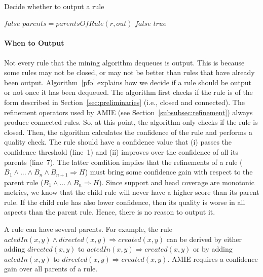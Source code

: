 \ \\[-1cm]
\begin{algorithm}
\caption{Decide whether to output a rule}
\label{pfo}
\begin{algorithmic}[1]
      \State \Return $false$
    \EndIf 
    \State $parents = parentsOfRule(r, out)$
	\State \Return $false$
      \EndIf
    \EndFor
    \State \Return $true$
\EndFunction
\end{algorithmic}
\end{algorithm}

\paragraph{When to Output}\label{subsubsec:whenToOutput}
Not every rule that the mining algorithm dequeues is output. This is because some rules may not be closed, or may not be better than rules that have already been output. Algorithm~\ref{pfo} explains how we decide if a rule should be output or not once it has been dequeued.
The algorithm first checks if the rule is of the form described in Section~\ref{sec:preliminaries} (i.e., closed and connected).
The refinement operators used by AMIE (see Section~\ref{subsubsec:refinement}) always produce connected rules. 
So, at this point, the algorithm only checks if the rule is closed. Then, the algorithm calculates
the confidence of the rule and performs a quality check. The rule should have a confidence value that (i) passes the confidence threshold (line~1)
and (ii) improves over the confidence of all its parents (line~7).
The latter condition implies that the refinements of a rule ($B_1 \wedge ... \wedge B_n \wedge B_{n+1} \Rightarrow H$) must 
bring some confidence gain with respect to the parent rule
($B_1 \wedge ... \wedge B_n \Rightarrow H$). Since support and head coverage are monotonic metrics, 
we know that the child rule will never have a higher score than its parent rule. 
If the child rule has also lower confidence, then its quality is worse in all aspects than the parent rule. Hence, there is no reason to output it.

A rule can have several parents. For example, the rule $actedIn(x,y) \wedge directed(x,y) \Rightarrow created(x,y)$
can be derived by either adding $directed(x,y)$ to  $actedIn(x,y) \Rightarrow created(x,y)$ or by adding $actedIn(x,y)$ to
$directed(x,y) \Rightarrow created(x,y)$. AMIE requires a confidence gain over all parents of a rule.

